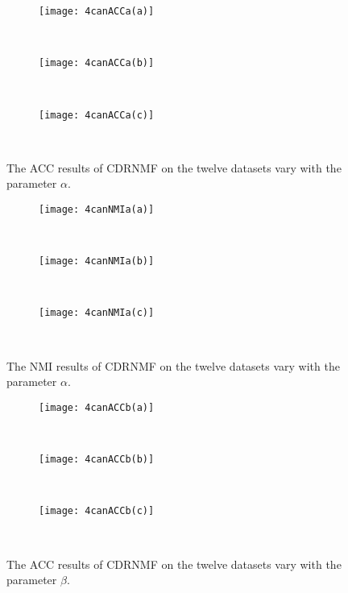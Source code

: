 \documentclass[a4paper,fleqn]{cas-sc}
\begin{document}
\begin{figure}[!t]
	\centering
	\begin{subfigure}[b]{.23\textwidth}
		\centering
		\texttt{[image: 4canACCa(a)]}
		\caption{~}\label{subfig:4canACCa(a)}
	\end{subfigure}
	\begin{subfigure}[b]{.23\textwidth}
		\centering
		\texttt{[image: 4canACCa(b)]}
		\caption{~}\label{subfig:4canACCa(b)}
	\end{subfigure}
	\begin{subfigure}[b]{.23\textwidth}
		\centering
		\texttt{[image: 4canACCa(c)]}
		\caption{~}\label{subfig:4canACCa(c)}
	\end{subfigure}
	
	\caption{The ACC results of CDRNMF on the twelve datasets vary with the parameter $\alpha$.}\label{fig:4canACCa}
\end{figure}

\begin{figure}[!t]
	\centering
	\begin{subfigure}[b]{.23\textwidth}
		\centering
		\texttt{[image: 4canNMIa(a)]}
		\caption{~}\label{subfig:4canNMIa(a)}
	\end{subfigure}
	\begin{subfigure}[b]{.23\textwidth}
		\centering
		\texttt{[image: 4canNMIa(b)]}
		\caption{~}\label{subfig:4canNMIa(b)}
	\end{subfigure}
	\begin{subfigure}[b]{.23\textwidth}
		\centering
		\texttt{[image: 4canNMIa(c)]}
		\caption{~}\label{subfig:4canNMIa(c)}
	\end{subfigure}
	
	\caption{The NMI results of CDRNMF on the twelve datasets vary with the parameter $\alpha$.}\label{fig:4canNMIa}
\end{figure}

\begin{figure}[!t]
	\centering
	\begin{subfigure}[b]{.23\textwidth}
		\centering
		\texttt{[image: 4canACCb(a)]}
		\caption{~}\label{subfig:4canACCb(a)}
	\end{subfigure}
	\begin{subfigure}[b]{.23\textwidth}
		\centering
		\texttt{[image: 4canACCb(b)]}
		\caption{~}\label{subfig:4canACCb(b)}
	\end{subfigure}
	\begin{subfigure}[b]{.23\textwidth}
		\centering
		\texttt{[image: 4canACCb(c)]}
		\caption{~}\label{subfig:4canACCb(c)}
	\end{subfigure}
	
	\caption{The ACC results of CDRNMF on the twelve datasets vary with the parameter $\beta$.}\label{fig:4canACCb}
\end{figure}
\end{document}
